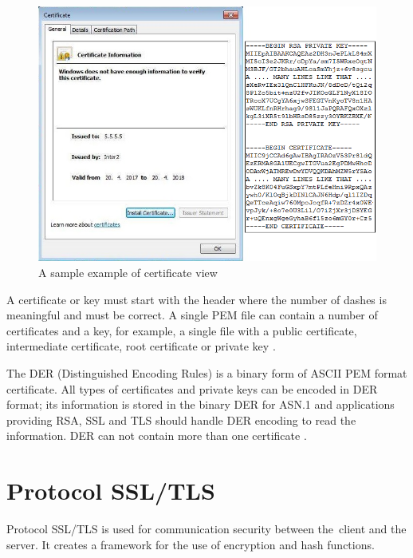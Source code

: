 \documentclass[
  twoside, 12pt, 
  printed, %
  notable,   %
  lof,     %
  lot,     %
]{fithesis3}
\begin{document}
\begin{figure}[th]
	\centering
	\includegraphics[width=1\textwidth]{pem-der-fig}
	\caption{A sample example of certificate view}
	\label{fig:vzorPEM-DER}
\end{figure}

A certificate or key must start with the header where the number of dashes is meaningful and must be correct. A single PEM file can contain a number of certificates and a key, for example, a 
single file with a public certificate, intermediate certificate, root certificate or private key 
\cite{howToSsl}.

The DER (Distinguished Encoding Rules) is a binary form of ASCII PEM format 
certificate. All types of certificates and private keys can be encoded in DER format; its  
information is stored in the binary DER for ASN.1 and applications providing RSA, SSL and TLS 
should handle DER encoding to read the information. DER can not contain more than one certificate \cite{bakker_2014}.

\section{Protocol SSL/TLS}
Protocol SSL/TLS is used for communication security between the~client and the server. It 
creates a framework for the use of encryption and hash functions.
\end{document}
